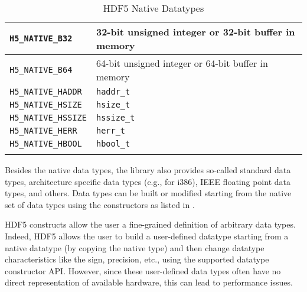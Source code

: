 \begin{longtable}{|>{\centering\arraybackslash} m{5.5cm} | >{\centering\arraybackslash} m{6cm} |}
        \small \texttt{H5\_NATIVE\_B32}     & \small 32-bit unsigned integer or 32-bit buffer in memory \\ \hline
        \small \texttt{H5\_NATIVE\_B64}     & \small 64-bit unsigned integer or 64-bit buffer in memory \\ \hline
        \small \texttt{H5\_NATIVE\_HADDR}   & \small \texttt{haddr\_t}                                  \\ \hline
        \small \texttt{H5\_NATIVE\_HSIZE}   & \small \texttt{hsize\_t}                                  \\ \hline
        \small \texttt{H5\_NATIVE\_HSSIZE}  & \small \texttt{hssize\_t}                                 \\ \hline
        \small \texttt{H5\_NATIVE\_HERR}    & \small \texttt{herr\_t}                                   \\ \hline
        \small \texttt{H5\_NATIVE\_HBOOL}   & \small \texttt{hbool\_t}                                  \\ \hline
        \caption{HDF5 Native Datatypes}
        \label{table: hdf5-types}
\end{longtable}

Besides the native data types, the library also provides so-called standard data types, architecture specific data types (e.g., for i386), IEEE floating point data types, and others.
Data types can be built or modified starting from the native set of data types using the constructors as listed in .

HDF5 constructs allow the user a fine-grained definition of arbitrary data types.
Indeed, HDF5 allows the user to build a user-defined datatype starting from a native datatype (by copying the native type) and then change datatype characteristics like the sign, precision, etc., using the supported datatype constructor API.
However, since these user-defined data types often have no direct representation of available hardware, this can lead to performance issues.

\clearpage

